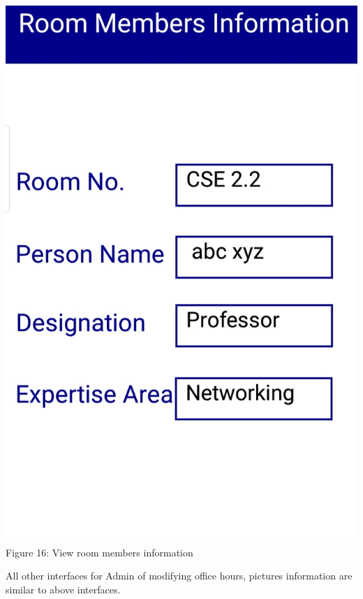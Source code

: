 \documentclass{article}
\begin{document}
\begin{center}
\includegraphics[scale=0.20]{f11}
\\Figure 16: View room members information
\end{center}
All other interfaces for Admin of modifying office hours, pictures information are similar to above interfaces.
\end{document}
